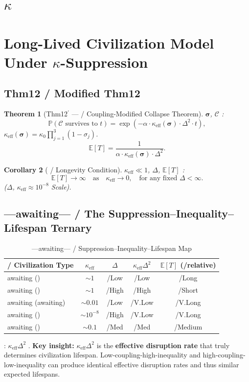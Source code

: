\documentclass[11pt,a4paper]{article}
\newtheorem{theorem}{Theorem}[section]
\newtheorem{corollary}[theorem]{Corollary}
\theoremstyle{definition}
\newcommand{\civ}{\mathcal{C}}
\newcommand{\coupling}{\kappa}
\newcommand{\suppress}{\sigma}
\newcommand{\E}{\mathbb{E}}
\newcommand{\paren}[1]{\left(#1\right)}
\begin{document}
\section{$\coupling$}
\section{Long-Lived Civilization Model Under $\coupling$-Suppression}
\subsection{ Thm12 / Modified Thm12}
\begin{theorem}[Thm12$^\prime$ --- / Coupling-Modified Collapse Theorem]
\label{thm:thm12prime}
 $\bm{\suppress}$, $\civ$ : 
\[
\mathbb{P}(\civ \text{ survives to } t) = \exp\paren{-\alpha \cdot
 \coupling_{\text{eff}}(\bm{\suppress}) \cdot \Delta^2 \cdot t},
\]
 $\coupling_{\text{eff}}(\bm{\suppress}) = \coupling_0 \prod_{j=1}^3 (1 - \suppress_j)$.
\[
\E[T] = \frac{1}{\alpha \cdot \coupling_{\text{eff}}(\bm{\suppress}) \cdot \Delta^2}.
\]
\end{theorem}
\begin{corollary}[ / Longevity Condition]
\label{cor:longevity}
 $\coupling_{\text{eff}} \ll 1$, $\Delta$, $\E[T]$ : 
\[
\E[T] \to \infty \quad \text{as} \quad \coupling_{\text{eff}} \to 0,
\quad \text{for any fixed } \Delta < \infty.
\]
($\Delta$, $\coupling_{\text{eff}} \approx 10^{-8}$ Scale).
\end{corollary}
\subsection{---awaiting--- / The Suppression--Inequality--Lifespan Ternary}
\begin{table}[htbp]
\centering
\caption{---awaiting--- / Suppression--Inequality--Lifespan Map}
\label{tab:ternary}
\begin{tabular}{@{}lcccc@{}}
\toprule
\textbf{ / Civilization Type} &
\textbf{$\coupling_{\text{eff}}$} &
\textbf{$\Delta$} &
\textbf{$\coupling_{\text{eff}}\Delta^2$} &
\textbf{$\E[T]$ (/relative)} \\
\midrule
awaiting () & $\sim 1$ & /Low & /Low & /Long \\
awaiting () & $\sim 1$ & /High & /High & /Short \\
awaiting (awaiting) & $\sim 0.01$ & /Low & /V.Low & /V.Long \\
awaiting () & $\sim 10^{-8}$ & /High & /V.Low & /V.Long \\
awaiting () & $\sim 0.1$ & /Med & /Med & /Medium \\
\bottomrule
\end{tabular}
\end{table}
: $\coupling_{\text{eff}}\Delta^2$ .
\textbf{Key insight:} $\coupling_{\text{eff}}\Delta^2$ is the \textbf{effective disruption rate}
that truly determines civilization lifespan. Low-coupling-high-inequality and
high-coupling-low-inequality can produce identical effective disruption rates and thus
similar expected lifespans.
\end{document}
